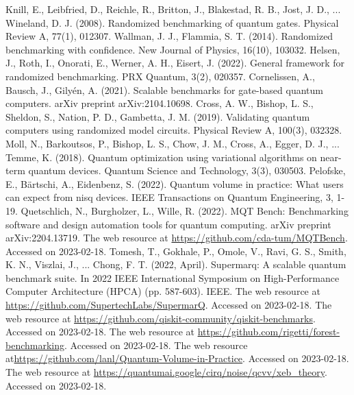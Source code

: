 \documentclass[preprint,12pt, a4paper, dvipsnames]{elsarticle}
\newcommand{\1}{{\rm 1\hspace{-0.9mm}l}}
\theoremstyle{definition}
\begin{document}
\begin{thebibliography}{00}
Knill, E., Leibfried, D., Reichle, R., Britton, J., Blakestad, R. B., Jost, J. D., ...  Wineland, D. J. (2008). Randomized benchmarking of quantum gates. Physical Review A, 77(1), 012307.
 Wallman, J. J.,  Flammia, S. T. (2014). Randomized benchmarking with confidence. New Journal of Physics, 16(10), 103032.
 Helsen, J., Roth, I., Onorati, E., Werner, A. H.,  Eisert, J. (2022). General framework for randomized benchmarking. PRX Quantum, 3(2), 020357.
 Cornelissen, A., Bausch, J.,  Gilyén, A. (2021). Scalable benchmarks for gate-based quantum computers. arXiv preprint arXiv:2104.10698.
Cross, A. W., Bishop, L. S., Sheldon, S., Nation, P. D., Gambetta, J. M. (2019). Validating quantum computers using randomized model circuits. Physical Review A, 100(3), 032328.
Moll, N., Barkoutsos, P., Bishop, L. S., Chow, J. M., Cross, A., Egger, D. J., ...  Temme, K. (2018). Quantum optimization using variational algorithms on near-term quantum devices. Quantum Science and Technology, 3(3), 030503.
 Pelofske, E., Bärtschi, A.,  Eidenbenz, S. (2022). Quantum volume in practice: What users can expect from nisq devices. IEEE Transactions on Quantum Engineering, 3, 1-19.
	 Quetschlich, N., Burgholzer, L., Wille, R. (2022). MQT Bench: Benchmarking software and design automation tools for quantum computing. arXiv preprint arXiv:2204.13719.
 The web resource at  \url{https://github.com/cda-tum/MQTBench}. Accessed on 2023-02-18.
	 Tomesh, T., Gokhale, P., Omole, V., Ravi, G. S., Smith, K. N., Viszlai, J., ...  Chong, F. T. (2022, April). Supermarq: A scalable quantum benchmark suite. In 2022 IEEE International Symposium on High-Performance Computer Architecture (HPCA) (pp. 587-603). IEEE.
 The web resource at \url{https://github.com/SupertechLabs/SupermarQ}. Accessed on 2023-02-18.
 The web resource at
\url{https://github.com/qiskit-community/qiskit-benchmarks}. Accessed on 2023-02-18.
 The web resource at \url{https://github.com/rigetti/forest-benchmarking}. Accessed on 2023-02-18.
 The web resource at\url{https://github.com/lanl/Quantum-Volume-in-Practice}. Accessed on 2023-02-18.
 The web resource at
\url{https://quantumai.google/cirq/noise/qcvv/xeb_theory}.  Accessed on 2023-02-18.

\end{thebibliography}
\end{document}
